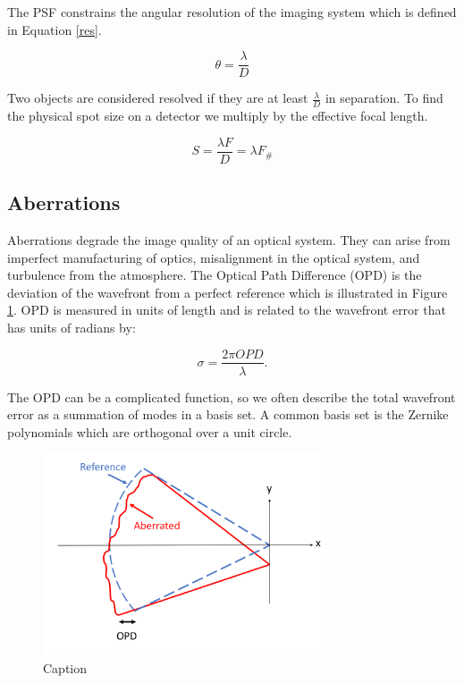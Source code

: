 The PSF constrains the angular resolution of the imaging system which is defined in Equation \ref{res}.

\begin{equation}
    \theta=\frac{\lambda}{D}
    \label{res}
\end{equation}
 
Two objects are considered resolved if they are at least $\frac{ \lambda}{D}$ in separation. To find the physical spot size on a detector we multiply by the effective focal length.

\begin{equation}
S=\frac{ \lambda F}{D} = \lambda F_\#
\end{equation}

\subsection{Aberrations}

Aberrations degrade the image quality of an optical system. They can arise from imperfect manufacturing of optics, misalignment in the optical system, and turbulence from the atmosphere. The Optical Path Difference (OPD) is the deviation of the wavefront from a perfect reference which is illustrated in Figure \ref{fig:OPD}. OPD is measured in units of length and is related to the wavefront error that has units of radians by:

\begin{equation}
    \sigma= \frac{2\pi OPD}{\lambda}.
\end{equation}

The OPD can be a complicated function, so we often describe the total wavefront error as a summation of modes in a basis set. A common basis set is the Zernike polynomials which are orthogonal over a unit circle.

\begin{figure}
    \centering
    \includegraphics[width=0.75\textwidth]{Chapter Materials/Introduction Materials/Introduction Figures/OPD.png}
    \caption{Caption}
    \label{fig:OPD}
\end{figure}

